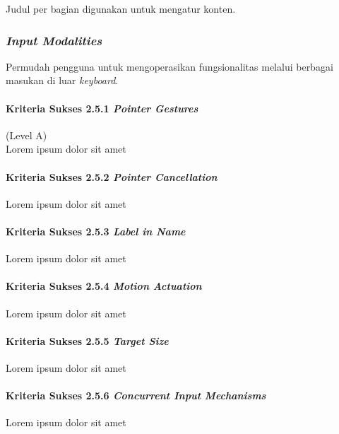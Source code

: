 Judul per bagian digunakan untuk mengatur konten.

\subsubsection{\textit{Input Modalities}}
\label{sec:input_modalities}
Permudah pengguna untuk mengoperasikan fungsionalitas melalui berbagai masukan di luar \textit{keyboard}.

\paragraph{Kriteria Sukses 2.5.1 \textit{Pointer Gestures}}
\label{sec:kriteria_sukses_2.5.1}
(Level A)\\

Lorem ipsum dolor sit amet

\paragraph{Kriteria Sukses 2.5.2 \textit{Pointer Cancellation}}
\label{sec:kriteria_sukses_2.5.2}
Lorem ipsum dolor sit amet

\paragraph{Kriteria Sukses 2.5.3 \textit{Label in Name}}
\label{sec:kriteria_sukses_2.5.3}
Lorem ipsum dolor sit amet

\paragraph{Kriteria Sukses 2.5.4 \textit{Motion Actuation}}
\label{sec:kriteria_sukses_2.5.4}
Lorem ipsum dolor sit amet

\paragraph{Kriteria Sukses 2.5.5 \textit{Target Size}}
\label{sec:kriteria_sukses_2.5.5}
Lorem ipsum dolor sit amet

\paragraph{Kriteria Sukses 2.5.6 \textit{Concurrent Input Mechanisms}}
\label{sec:kriteria_sukses_2.5.6}
Lorem ipsum dolor sit amet


